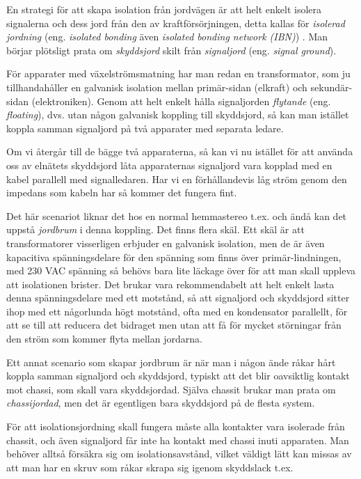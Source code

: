 En strategi för att skapa isolation från jordvägen är att helt enkelt
isolera signalerna och dess jord från den av kraftförsörjningen, detta kallas
för \emph{isolerad jordning} (eng. \emph{isolated bonding} även \emph{isolated
bonding network (IBN)}) \cite[3.2.4]{K27-1991}.
Man börjar plötsligt prata om \emph{skyddsjord} skilt från \emph{signaljord}
(eng. \emph{signal ground}).

För apparater med växelströmsmatning har man redan en transformator, som ju
tillhandahåller en galvanisk isolation mellan primär-sidan (elkraft) och
sekundär-sidan (elektroniken). Genom att helt enkelt hålla signaljorden
\emph{flytande} (eng. \emph{floating}), dvs. utan någon galvanisk koppling
till skyddsjord, så kan man istället koppla samman signaljord på två apparater
med separata ledare.

Om vi återgår till de bägge två apparaterna, så kan vi nu istället för att
använda oss av elnätets skyddsjord låta apparaternas signaljord vara kopplad
med en kabel parallell med signalledaren. Har vi en förhållandevis låg ström
genom den impedans som kabeln har så kommer det fungera fint.

Det här scenariot liknar det hos en normal hemmastereo t.ex. och ändå kan det
uppstå \emph{jordbrum} i denna koppling. Det finns flera skäl. Ett skäl är att
transformatorer visserligen erbjuder en galvanisk isolation, men de är även
kapacitiva spänningsdelare för den spänning som finns över primär-lindningen,
med 230 VAC spänning så behövs bara lite läckage över för att man skall
uppleva att isolationen brister. Det brukar vara rekommendabelt att helt
enkelt lasta denna spänningsdelare med ett motstånd, så att signaljord och
skyddsjord sitter ihop med ett någorlunda högt motstånd, ofta med en
kondensator parallellt, för att se till att reducera det bidraget men utan att
få för mycket störningar från den ström som kommer flyta mellan jordarna.

Ett annat scenario som skapar jordbrum är när man i någon ände råkar hårt
koppla samman signaljord och skyddsjord, typiskt att det blir oavsiktlig
kontakt mot chassi, som skall vara skyddsjordad. Själva chassit brukar man
prata om \emph{chassijordad}, men det är egentligen bara skyddsjord på de
flesta system.

För att isolationsjordning skall fungera måste alla kontakter vara isolerade
från chassit, och även signaljord får inte ha kontakt med chassi inuti
apparaten. Man behöver alltså försäkra sig om isolationsavstånd, vilket
väldigt lätt kan missas av att man har en skruv som råkar skrapa sig igenom
skyddslack t.ex.

